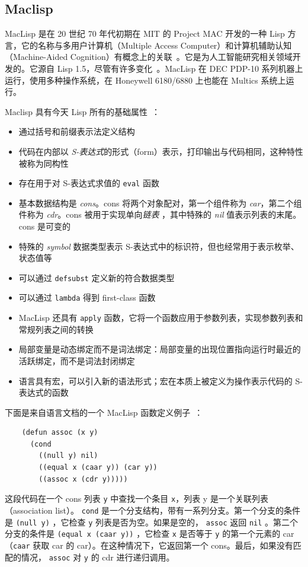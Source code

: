 \documentclass[format=acmsmall,screen]{acmart}
\begin{document}
\subsection{Maclisp}

MacLisp 是在 20 世纪 70 年代初期在 MIT 的 Project MAC 开发的一种 Lisp 方言，它的名称与多用户计算机（Multiple Access Computer）和计算机辅助认知（Machine-Aided Cognition）有概念上的关联~\cite{Pitman1983}。它是为人工智能研究相关领域开发的。它源自 Lisp 1.5，尽管有许多变化~\cite{Moon1974}。MacLisp 在 DEC PDP-10 系列机器上运行，使用多种操作系统，在 Honeywell 6180/6880 上也能在 Multics 系统上运行。

\noindent
Maclisp 具有今天 Lisp 所有的基础属性~\cite{Moon1974}：

\begin{itemize}
%
\item 通过括号和前缀表示法定义结构
\item 代码在内部以 \textit{S-表达式}的形式（form）表示，打印输出与代码相同，这种特性被称为同构性
\item 存在用于对 S-表达式求值的 \texttt{eval} 函数
\item 基本数据结构是 \textit{cons}。cons 将两个对象配对，第一个组件称为 \textit{car}，第二个组件称为 \textit{cdr}。cons 被用于实现单向\textit{链表} ，其中特殊的 \textit{nil} 值表示列表的末尾。cons 是可变的
\item 特殊的 \textit{symbol} 数据类型表示 S-表达式中的标识符，但也经常用于表示枚举、状态值等
\item 可以通过 \texttt{defsubst} 定义新的符合数据类型
\item 可以通过 \texttt{lambda} 得到 first-class 函数
\item MacLisp 还具有 \texttt{apply} 函数，它将一个函数应用于参数列表，实现参数列表和常规列表之间的转换
\item 局部变量是动态绑定而不是词法绑定：局部变量的出现位置指向运行时最近的活跃绑定，而不是词法封闭绑定
\item 语言具有宏，可以引入新的语法形式；宏在本质上被定义为操作表示代码的 S-表达式的函数
%
\end{itemize}
%
下面是来自语言文档的一个 MacLisp 函数定义例子~\cite{Moon1974}：
%
\begin{verbatim}
    (defun assoc (x y)
      (cond
        ((null y) nil)
        ((equal x (caar y)) (car y))
        ((assoc x (cdr y)))))
\end{verbatim}
%

这段代码在一个 cons 列表 \texttt{y} 中查找一个条目 \texttt{x}，列表 y 是一个关联列表（association list）。 \texttt{cond} 是一个分支结构，带有一系列分支。第一个分支的条件是 \texttt{(null y)} ，它检查 \texttt{y} 列表是否为空。如果是空的， \texttt{assoc} 返回 \texttt{nil} 。第二个分支的条件是 \texttt{(equal x (caar y))} ，它检查 \texttt{x} 是否等于 \texttt{y} 的第一个元素的 car（\texttt{caar} 获取 car 的 car）。在这种情况下，它返回第一个 cons。最后，如果没有匹配的情况， \texttt{assoc} 对 \texttt{y} 的 cdr 进行递归调用。
\end{document}
